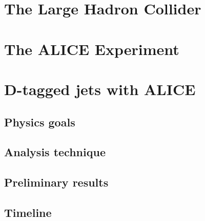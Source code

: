 \documentclass[12pt, a4paper, twoside, titlepage]{article}
\begin{document}
\section{The Large Hadron Collider}

\section{The ALICE Experiment}

\section{D-tagged jets with ALICE}
\subsection{Physics goals}
\subsection{Analysis technique}
\subsection{Preliminary results}
\subsection{Timeline}
{}

\end{document}
